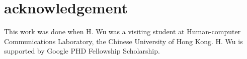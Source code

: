 \section{acknowledgement}
\label{sec:acknowledge}
This work was done when H. Wu was a visiting student at Human-computer Communications Laboratory, the Chinese University of Hong Kong.
H. Wu is supported by Google PHD Fellowship Scholarship.
